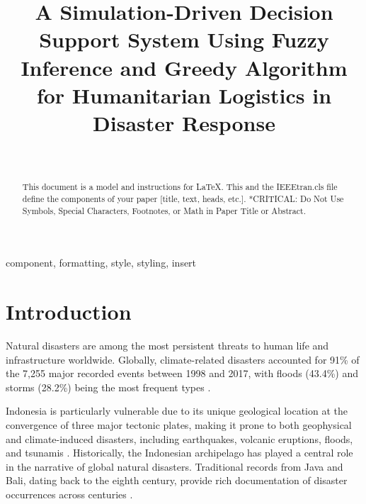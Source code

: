 \documentclass[journal,final,a4paper,twoside,11pt]{IEEEtran}
\begin{document}
\title{A Simulation-Driven Decision Support System Using Fuzzy Inference and Greedy Algorithm for Humanitarian Logistics in Disaster Response\\
}

\author{
    \\
    }

\maketitle

\begin{abstract}
This document is a model and instructions for \LaTeX.
This and the IEEEtran.cls file define the components of your paper [title, text, heads, etc.]. *CRITICAL: Do Not Use Symbols, Special Characters, Footnotes, 
or Math in Paper Title or Abstract.
\end{abstract}

\begin{IEEEkeywords}
component, formatting, style, styling, insert
\end{IEEEkeywords}

\section{Introduction}

Natural disasters are among the most persistent threats to human life and infrastructure worldwide. Globally, climate-related disasters accounted for 91\% of the 7,255 major recorded events between 1998 and 2017, with floods (43.4\%) and storms (28.2\%) being the most frequent types \cite{teh2021types}. 

Indonesia is particularly vulnerable due to its unique geological location at the convergence of three major tectonic plates, making it prone to both geophysical and climate-induced disasters, including earthquakes, volcanic eruptions, floods, and tsunamis \cite{hakim2020review}. Historically, the Indonesian archipelago has played a central role in the narrative of global natural disasters. Traditional records from Java and Bali, dating back to the eighth century, provide rich documentation of disaster occurrences across centuries \cite{sastrawan2022portents}.
\end{document}
